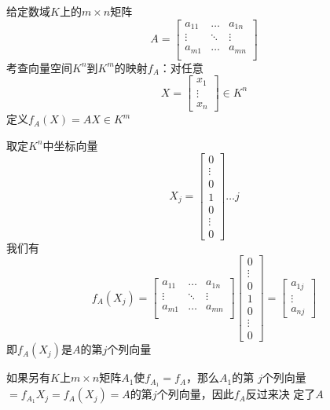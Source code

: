 \documentclass[11pt]{article}
\begin{document}
给定数域\(K\)上的\(m\times n\)矩阵
\begin{equation*}
A=
\begin{bmatrix}
a_{11}&\dots&a_{1n}\\
\vdots&\ddots&\vdots\\
a_{m1}&\dots&a_{mn}\\
\end{bmatrix}
\end{equation*}
考查向量空间\(K^n\)到\(K^m\)的映射\(f_A\)：对任意
\begin{equation*}
X=
\begin{bmatrix}
x_1\\\vdots\\x_n
\end{bmatrix}\in K^n
\end{equation*}
定义\(f_A(X)=AX\in K^m\)

取定\(K^n\)中坐标向量
\begin{equation*}
X_j=
\begin{bmatrix}
0\\\vdots\\0\\1\\0\\\vdots\\0
\end{bmatrix}\dots j
\end{equation*}
我们有
\begin{equation*}
f_A(X_j)=
\begin{bmatrix}
a_{11}&\dots&a_{1n}\\
\vdots&\ddots&\vdots\\
a_{m1}&\dots&a_{mn}\\
\end{bmatrix}
\begin{bmatrix}
0\\\vdots\\0\\1\\0\\\vdots\\0
\end{bmatrix}=
\begin{bmatrix}
a_{1j}\\\vdots\\a_{nj}
\end{bmatrix}
\end{equation*}
即\(f_A(X_j)\)是\(A\)的第\(j\)个列向量

如果另有\(K\)上\(m\times n\)矩阵\(A_1\)使\(f_{A_1}=f_A\)，那么\(A_1\)的第
\(j\)个列向量\(=f_{A_1}X_j=f_A(X_j)=A\)的第\(j\)个列向量，因此\(f_A\)反过来决
定了\(A\)
\end{document}
